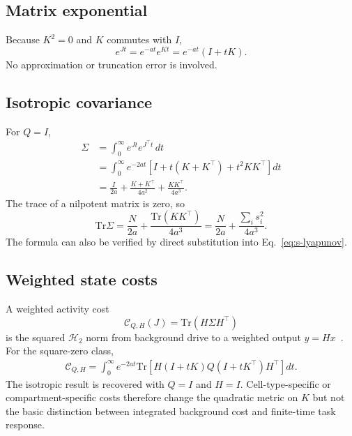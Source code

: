 \documentclass[
  aps,prl,preprint,notitlepage,superscriptaddress,nofootinbib,longbibliography,
  amsmath,amssymb
]{revtex4-2}
\newcommand{\Tr}{\mathrm{Tr}}
\newcommand{\Cnoise}{\mathcal{C}}
\begin{document}
\subsection{Matrix exponential}

Because $K^2=0$ and $K$ commutes with $I$,
\begin{equation}
e^{Jt}=e^{-at}e^{Kt}=e^{-at}(I+tK).
\label{eq:s-expm}
\end{equation}
No approximation or truncation error is involved.

\subsection{Isotropic covariance}

For $Q=I$,
\begin{align}
\Sigma
&=\int_0^\infty e^{Jt}e^{J^\top t}\,dt\\
&=\int_0^\infty e^{-2at}
\left[I+t(K+K^\top)+t^2KK^\top\right]dt\\
&=\frac{I}{2a}
+\frac{K+K^\top}{4a^2}
+\frac{KK^\top}{4a^3}.
\label{eq:s-sigma}
\end{align}
The trace of a nilpotent matrix is zero, so
\begin{equation}
\Tr\Sigma
=\frac{N}{2a}+\frac{\Tr(KK^\top)}{4a^3}
=\frac{N}{2a}+\frac{\sum_i s_i^2}{4a^3}.
\label{eq:s-costexact}
\end{equation}
The formula can also be verified by direct substitution into
Eq.~\eqref{eq:s-lyapunov}.

\subsection{Weighted state costs}

A weighted activity cost
\begin{equation}
\Cnoise_{Q,H}(J)=\Tr(H\Sigma H^\top)
\end{equation}
is the squared $\mathcal H_2$ norm from background drive to a weighted output
$y=Hx$~\cite{jovanovic2005}. For the square-zero class,
\begin{align}
\Cnoise_{Q,H}
=\int_0^\infty e^{-2at}
\Tr\!\left[
H(I+tK)Q(I+tK^\top)H^\top
\right]dt .
\end{align}
The isotropic result is recovered with $Q=I$ and $H=I$. Cell-type-specific or
compartment-specific costs therefore change the quadratic metric on $K$ but not
the basic distinction between integrated background cost and finite-time task
response.

\end{document}
